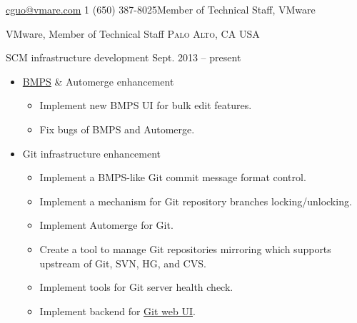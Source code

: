 \documentclass[10pt,letterpaper]{article}
\begin{document}
 



\noindent\href{mailto:cguo@vmware.com}{cguo@vmare.com}\bull
\textsmaller{+}1 (650) 387-8025\bull Member of Technical Staff, VMware

\spacedhrule{0.9em}{-0.4em} %



\headedsection
{VMware, Member of Technical Staff}
{\textsc{Palo Alto, CA USA}} {
\headedsubsection 
{SCM infrastructure development} {Sept. 2013 -- present}
{
    \begin{itemize}
        \item \href{http://bmps.eng.vmware.com}{BMPS} \& Automerge enhancement
            \begin{itemize}
                \item Implement new BMPS UI for bulk edit features.
                \item Fix bugs of BMPS and Automerge.
            \end{itemize}
        \item Git infrastructure enhancement
            \begin{itemize}
                \item Implement a BMPS-like Git commit message format control.
                \item Implement a mechanism for Git repository branches locking/unlocking.
                \item Implement Automerge for Git.
                \item Create a tool to manage Git repositories mirroring which
                    supports upstream of Git, SVN, HG, and CVS.
                \item Implement tools for Git server health check.
                \item Implement backend for
                    \href{http://git.eng.vmware.com}{Git web UI}.
            \end{itemize}

    \end{itemize}
}
}
\end{document}
